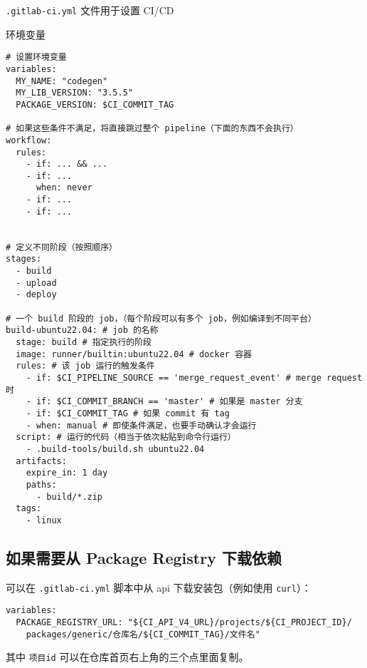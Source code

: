 
\verb`.gitlab-ci.yml` 文件用于设置 CI/CD

环境变量
\begin{lstlisting}[language=none]
# 设置环境变量
variables:
  MY_NAME: "codegen"
  MY_LIB_VERSION: "3.5.5"
  PACKAGE_VERSION: $CI_COMMIT_TAG

# 如果这些条件不满足，将直接跳过整个 pipeline（下面的东西不会执行）
workflow:
  rules:
    - if: ... && ...
    - if: ...
      when: never
    - if: ...
    - if: ...


# 定义不同阶段（按照顺序）
stages:
  - build
  - upload
  - deploy

# 一个 build 阶段的 job，（每个阶段可以有多个 job，例如编译到不同平台）
build-ubuntu22.04: # job 的名称
  stage: build # 指定执行的阶段
  image: runner/builtin:ubuntu22.04 # docker 容器
  rules: # 该 job 运行的触发条件
    - if: $CI_PIPELINE_SOURCE == 'merge_request_event' # merge request 时
    - if: $CI_COMMIT_BRANCH == 'master' # 如果是 master 分支
    - if: $CI_COMMIT_TAG # 如果 commit 有 tag
    - when: manual # 即使条件满足，也要手动确认才会运行
  script: # 运行的代码（相当于依次粘贴到命令行运行）
    - .build-tools/build.sh ubuntu22.04
  artifacts:
    expire_in: 1 day
    paths:
      - build/*.zip
  tags:
    - linux
\end{lstlisting}

\subsection{如果需要从 Package Registry 下载依赖}
可以在 \verb`.gitlab-ci.yml` 脚本中从 api 下载安装包（例如使用 \verb`curl`）：
\begin{lstlisting}[language=none]
variables:
  PACKAGE_REGISTRY_URL: "${CI_API_V4_URL}/projects/${CI_PROJECT_ID}/
    packages/generic/仓库名/${CI_COMMIT_TAG}/文件名"
\end{lstlisting}
其中 \verb`项目id` 可以在仓库首页右上角的三个点里面复制。
